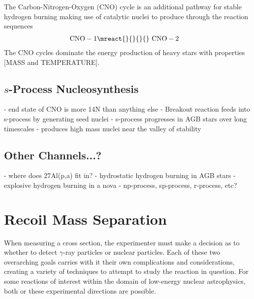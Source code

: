 The Carbon-Nitrogen-Oxygen (CNO) cycle is an additional pathway for stable
hydrogen burning making use of catalytic nuclei to produce  through
the reaction sequences
\begin{align*}
    \rm{CNO-1}& \mreact{}{}{}{} \
    \rm{CNO-2}&
\end{align*}
The CNO cycles dominate the energy production of heavy stars with properties
[MASS and TEMPERATURE].

\subsection{$s$-Process Nucleosynthesis}

- end state of CNO is more 14N than anything else
- Breakout reaction feeds into s-process by generating seed nuclei
- s-process progresses in AGB stars over long timescales
- produces high mass nuclei near the valley of stability

\subsection{Other Channels...?}

- where does 27Al(p,a) fit in?
- hydrostatic hydrogen burning in AGB stars
- explosive hydrogen burning in a nova
- np-process, sp-process, r-process, etc?


\section{Recoil Mass Separation}
\label{sec:ch01-recoil-mass-separation}

When measuring a cross section, the experimenter must make a decision as to
whether to detect $\gamma$-ray particles or nuclear particles. Each of these
two overarching goals carries with it their own complications and
considerations, creating a variety of techniques to attempt to study the
reaction in question. For some reactions of interest within the domain of
low-energy nuclear astrophysics, both or these experimental directions are
possible.

